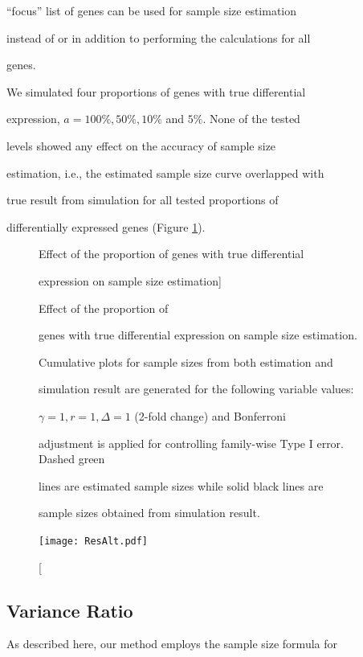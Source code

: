 \documentclass[12pt]{article}
\begin{document}
``focus'' list of genes can be used for sample size estimation

instead of or in addition to performing the calculations for all

genes.



We simulated four proportions of genes with true differential

expression, $a = 100\%, 50\%, 10\%$ and $5\%$. None of the tested

levels showed any effect on the accuracy of sample size

estimation, i.e., the estimated sample size curve overlapped with

true result from simulation for all tested proportions of

differentially expressed genes (Figure \ref{fig:ResAlt}).



\begin{figure}%

  \caption[Effect of the proportion of genes with true differential

    expression on sample size estimation] {Effect of the proportion of

    genes with true differential expression on sample size estimation.

    Cumulative plots for sample sizes from both estimation and

    simulation result are generated for the following variable values:

    $\gamma = 1, r = 1, \Delta = 1$ (2-fold change) and Bonferroni

    adjustment is applied for controlling family-wise Type I error. Dashed green

    lines are estimated sample sizes while solid black lines are

    sample sizes obtained from simulation result.}

  \label{fig:ResAlt}

  \centerline{\texttt{[image: ResAlt.pdf]}}

\end{figure}



\subsection{Variance Ratio}



As described here, our method employs the sample size formula for
\end{document}
